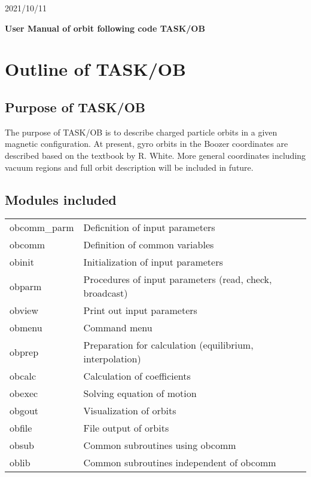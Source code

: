 \documentclass[11pt]{article}
\begin{document}
\begin{flushright}
2021/10/11
\end{flushright}

\begin{center}
\textbf{\Large User Manual of orbit following code TASK/OB}
\end{center}

\tableofcontents

\section{Outline of TASK/OB}

\subsection{Purpose of TASK/OB}

The purpose of TASK/OB is to describe charged particle orbits in a
given magnetic configuration.  At present, gyro orbits in the Boozer
coordinates are described based on the textbook by R. White.  More
general coordinates including vacuum regions and full orbit
description will be included in future.  

\subsection{Modules included}

\begin{center}
  \begin{tabular}{ll}
	obcomm\_parm & Deficnition of input parameters \\
	obcomm & Definition of common variables \\
	obinit & Initialization of input parameters \\
	obparm & Procedures of input parameters (read, check,
        broadcast) \\
	obview & Print out input parameters \\
	obmenu & Command menu \\
	obprep & Preparation for calculation (equilibrium,
        interpolation) \\
	obcalc & Calculation of coefficients \\
	obexec & Solving equation of motion \\
	obgout & Visualization of orbits \\
	obfile & File output of orbits \\
	obsub & Common subroutines using obcomm \\
	oblib & Common subroutines independent of obcomm
  \end{tabular}
\end{center}
\end{document}
